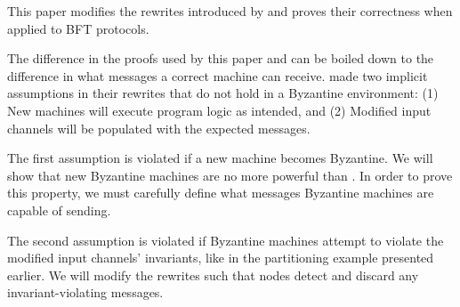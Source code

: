 This paper modifies the rewrites introduced by \sigmodpaper{} and proves their correctness when applied to BFT protocols.

The difference in the proofs used by this paper and \sigmodpaper{} can be boiled down to the difference in what messages a correct machine can receive.
\sigmodpaper{} made two implicit assumptions in their rewrites that do not hold in a Byzantine environment:
(1) New machines will execute program logic as intended, and
(2) Modified input channels will be populated with the expected messages.

The first assumption is violated if a new machine becomes Byzantine.
We will show that new Byzantine machines are no more powerful than . 
In order to prove this property, we must carefully define what messages Byzantine machines are capable of sending.

The second assumption is violated if Byzantine machines attempt to violate the modified input channels' invariants, like in the partitioning example presented earlier.
We will modify the rewrites such that nodes detect and discard any invariant-violating messages.